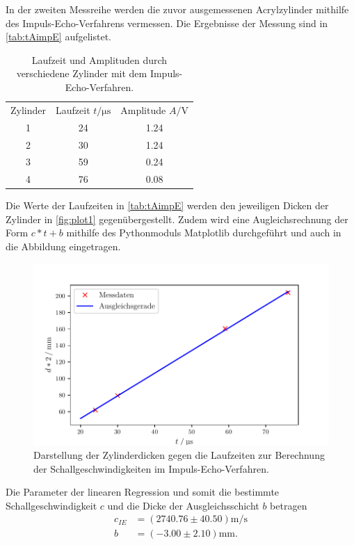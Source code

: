 In der zweiten Messreihe werden die zuvor ausgemessenen Acrylzylinder mithilfe des Impuls-Echo-Verfahrens vermessen.
Die Ergebnisse der Messung sind in \autoref{tab:tAimpE} aufgelistet.
\begin{table}[H]
  \centering
  \caption{Laufzeit und Amplituden durch verschiedene Zylinder mit dem Impuls-Echo-Verfahren.}
  \label{tab:tAimpE}
  \begin{tabular}{S[table-format=1.0] S[table-format=2.0] S[table-format=1.2] }
  \toprule
  {Zylinder} & {Laufzeit $t / \si{\micro\second}$} &  {Amplitude $A / \si{\volt}$}\\
  1 &  24  & 1.24  \\
  2 &  30  & 1.24  \\
  3 &  59  & 0.24  \\
  4 &  76  & 0.08  \\
  \bottomrule
  \end{tabular}
\end{table}
Die Werte der Laufzeiten in \autoref{tab:tAimpE} werden den jeweiligen Dicken der Zylinder in \autoref{fig:plot1} gegenübergestellt.
Zudem wird eine Augleichsrechnung der Form $c*t+b$ mithilfe des Pythonmoduls Matplotlib \cite{matplotlib} durchgeführt und auch in die 
Abbildung eingetragen.
\begin{figure}[H]
  \centering
  \includegraphics{build/plot1.pdf}
  \caption {Darstellung der Zylinderdicken gegen die Laufzeiten zur Berechnung der Schallgeschwindigkeiten im Impuls-Echo-Verfahren.}
  \label{fig:plot1}
\end{figure}
Die Parameter der linearen Regression und somit die bestimmte Schallgeschwindigkeit $c$ und die Dicke der Ausgleichsschicht $b$ betragen
\begin{align*}
  c_{IE}& =( 2740.76\pm 40.50 ) \si{\meter\per\second}\\
  b &= (-3.00\pm 2.10) \si{\milli\meter}.
\end{align*}

